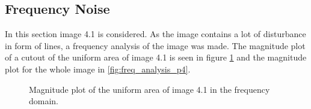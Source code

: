\subsection{Frequency Noise}
In this section image 4.1 is considered.
As the image contains a lot of disturbance in form of lines, a frequency analysis of the image was made.
The magnitude plot of a cutout of the uniform area of image 4.1 is seen in figure \ref{fig:freq_analysis_uni_p4} and the magnitude plot for the whole image in \ref{fig:freq_analysis_p4}.



\begin{figure}[H]
\centering
{}
\caption{Magnitude plot of the uniform area of image 4.1 in the frequency domain.}
\label{fig:freq_analysis_uni_p4}
\end{figure}


